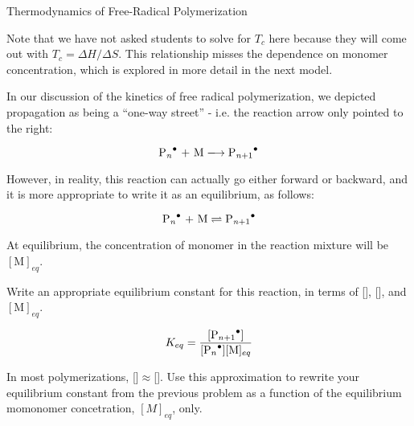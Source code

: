 \begin{activity}{Thermodynamics of Free-Radical Polymerization}
\begin{ctqs}
\begin{solution}[1.25in]
			Note that we have not asked students to solve for $T_c$ here because they will come out with $T_c = \Delta H/\Delta S$.  This relationship misses the dependence on monomer concentration, which is explored in more detail in the next model.
		\end{solution}

\end{ctqs}




\begin{model}
	\label{\labelbase:mdl:propequilib}

	In our discussion of the kinetics of free radical polymerization, we depicted propagation as being a ``one-way street'' - i.e. the reaction arrow only pointed to the right:
	
	\begin{equation*}
		\text{\ce{P_n^.} + M} \xlongrightarrow{} \text{\ce{P_{n+1}^.}}
	\end{equation*}
	
	However, in reality, this reaction can actually go either forward or backward, and it is more appropriate to write it as an equilibrium, as follows:
	
	\begin{equation*}
		\text{\ce{P_n^.} + M} \rightleftharpoons{} \text{\ce{P_{n+1}^.}}
	\end{equation*}
	
	At equilibrium, the concentration of monomer in the reaction mixture will be $[\text{M}]_{eq}$.
	
\end{model}


\begin{ctqs}

	\question Write an appropriate equilibrium constant for this reaction, in terms of [], [], and $[\text{M}]_{eq}$.
				
				\begin{solution}[1in]
					\begin{equation*}
						K_{eq} = \frac{[\ce{P_{n+1}^.}]}{[\ce{P_n^.}][\text{M}]_{eq}}
					\end{equation*}
				\end{solution}
	
	\question In most polymerizations, []$\approx$[].  Use this approximation to rewrite your equilibrium constant from the previous problem as a function of the equilibrium momonomer concetration, $[M]_{eq}$, only.
				

\end{ctqs}
\end{activity}
